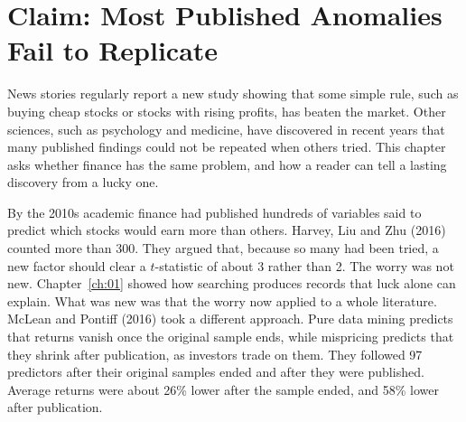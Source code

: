 \makeatletter
{}
\makeatother

\makeatletter
\makeatother

\chapter{Claim: Most Published Anomalies Fail to Replicate}
\label{ch:15}
\providecommand{\term}[1]{\emph{#1}}

News stories regularly report a new study showing that some simple rule, such as buying cheap stocks or stocks with rising profits, has beaten the market. Other sciences, such as psychology and medicine, have discovered in recent years that many published findings could not be repeated when others tried. This chapter asks whether finance has the same problem, and how a reader can tell a lasting discovery from a lucky one.

By the 2010s academic finance had published hundreds of variables said to predict which stocks would earn more than others. Harvey, Liu and Zhu (2016) counted more than 300. They argued that, because so many had been tried, a new factor should clear a $t$-statistic of about 3 rather than 2. The worry was not new. Chapter~\ref{ch:01} showed how searching produces records that luck alone can explain. What was new was that the worry now applied to a whole literature. McLean and Pontiff (2016) took a different approach. Pure data mining predicts that returns vanish once the original sample ends, while mispricing predicts that they shrink after publication, as investors trade on them. They followed 97 predictors after their original samples ended and after they were published. Average returns were about 26\% lower after the sample ended, and 58\% lower after publication.

